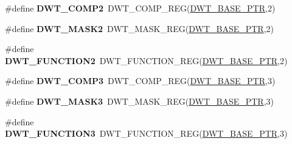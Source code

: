 \begin{DoxyCompactItemize}
\item 
\hypertarget{group___d_w_t___register___accessor___macros_ga9dee5b5f93e25b3d201b3974d339b6dc}{}\#define {\bfseries D\+W\+T\+\_\+\+C\+O\+M\+P2}~D\+W\+T\+\_\+\+C\+O\+M\+P\+\_\+\+R\+E\+G(\hyperlink{group___d_w_t___peripheral_ga3b46dfb2ea7946c6938028d879c82cb1}{D\+W\+T\+\_\+\+B\+A\+S\+E\+\_\+\+P\+T\+R},2)\label{group___d_w_t___register___accessor___macros_ga9dee5b5f93e25b3d201b3974d339b6dc}

\item 
\hypertarget{group___d_w_t___register___accessor___macros_ga7411a6dae412d8f551b32cc26709c3a3}{}\#define {\bfseries D\+W\+T\+\_\+\+M\+A\+S\+K2}~D\+W\+T\+\_\+\+M\+A\+S\+K\+\_\+\+R\+E\+G(\hyperlink{group___d_w_t___peripheral_ga3b46dfb2ea7946c6938028d879c82cb1}{D\+W\+T\+\_\+\+B\+A\+S\+E\+\_\+\+P\+T\+R},2)\label{group___d_w_t___register___accessor___macros_ga7411a6dae412d8f551b32cc26709c3a3}

\item 
\hypertarget{group___d_w_t___register___accessor___macros_ga3c79f0df76f81b08704f131d5ffa821d}{}\#define {\bfseries D\+W\+T\+\_\+\+F\+U\+N\+C\+T\+I\+O\+N2}~D\+W\+T\+\_\+\+F\+U\+N\+C\+T\+I\+O\+N\+\_\+\+R\+E\+G(\hyperlink{group___d_w_t___peripheral_ga3b46dfb2ea7946c6938028d879c82cb1}{D\+W\+T\+\_\+\+B\+A\+S\+E\+\_\+\+P\+T\+R},2)\label{group___d_w_t___register___accessor___macros_ga3c79f0df76f81b08704f131d5ffa821d}

\item 
\hypertarget{group___d_w_t___register___accessor___macros_gac9201f6f14e7cb06ad7a8b2b320a3cd9}{}\#define {\bfseries D\+W\+T\+\_\+\+C\+O\+M\+P3}~D\+W\+T\+\_\+\+C\+O\+M\+P\+\_\+\+R\+E\+G(\hyperlink{group___d_w_t___peripheral_ga3b46dfb2ea7946c6938028d879c82cb1}{D\+W\+T\+\_\+\+B\+A\+S\+E\+\_\+\+P\+T\+R},3)\label{group___d_w_t___register___accessor___macros_gac9201f6f14e7cb06ad7a8b2b320a3cd9}

\item 
\hypertarget{group___d_w_t___register___accessor___macros_gac347fb5cc7e7e7a24f6a630d0396c63e}{}\#define {\bfseries D\+W\+T\+\_\+\+M\+A\+S\+K3}~D\+W\+T\+\_\+\+M\+A\+S\+K\+\_\+\+R\+E\+G(\hyperlink{group___d_w_t___peripheral_ga3b46dfb2ea7946c6938028d879c82cb1}{D\+W\+T\+\_\+\+B\+A\+S\+E\+\_\+\+P\+T\+R},3)\label{group___d_w_t___register___accessor___macros_gac347fb5cc7e7e7a24f6a630d0396c63e}

\item 
\hypertarget{group___d_w_t___register___accessor___macros_gaaf86de8c82fa50d48260e53c59fc96b0}{}\#define {\bfseries D\+W\+T\+\_\+\+F\+U\+N\+C\+T\+I\+O\+N3}~D\+W\+T\+\_\+\+F\+U\+N\+C\+T\+I\+O\+N\+\_\+\+R\+E\+G(\hyperlink{group___d_w_t___peripheral_ga3b46dfb2ea7946c6938028d879c82cb1}{D\+W\+T\+\_\+\+B\+A\+S\+E\+\_\+\+P\+T\+R},3)\label{group___d_w_t___register___accessor___macros_gaaf86de8c82fa50d48260e53c59fc96b0}


\end{DoxyCompactItemize}
